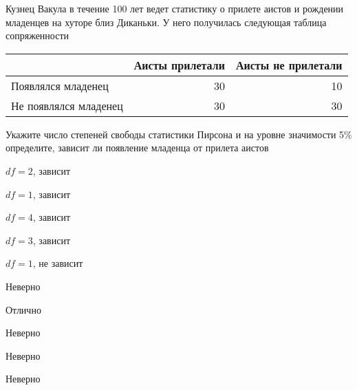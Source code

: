 
\begin{question}
Кузнец Вакула в течение 100 лет ведет статистику о прилете аистов и
рождении младенцев на хуторе близ Диканьки. У него получилась следующая
таблица сопряженности

\begin{center}
\begin{tabular}{lrr} \toprule
& Аисты прилетали  & Аисты не прилетали \\
\midrule
Появлялся младенец & 30 & 10 \\
Не появлялся младенец & 30 & 30 \\
\bottomrule
\end{tabular}
\end{center}

Укажите число степеней свободы статистики Пирсона и на уровне значимости
5\% определите, зависит ли появление младенца от прилета аистов
\begin{answerlist}
  \item \(df=2\), зависит
  \item \(df=1\), зависит
  \item \(df=4\), зависит
  \item \(df=3\), зависит
  \item \(df=1\), не зависит
\end{answerlist}
\end{question}

\begin{solution}
\begin{answerlist}
  \item Неверно
  \item Отлично
  \item Неверно
  \item Неверно
  \item Неверно
\end{answerlist}
\end{solution}

